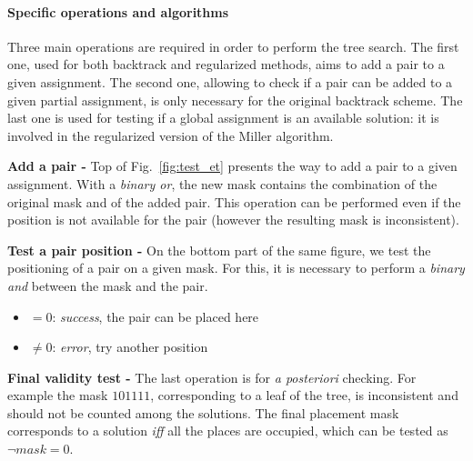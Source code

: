 \paragraph{Specific operations and algorithms}

Three main operations are required in order to perform the tree search. 
The first one, used for both backtrack and regularized methods, aims to add a pair to a given assignment. 
The second one, allowing to check if a pair can be added to a given partial assignment, is only necessary for the original backtrack scheme.
The last one is used for testing if a global assignment is an available solution: it is involved in the regularized version of the Miller algorithm.

\textbf{Add a pair -}
Top of Fig.~\ref{fig:test_et} presents the way to add a pair to a given assignment.
With a \emph{binary or}, the new mask contains the combination of the original mask and of the added pair.
This operation can be performed even if the position is not available for the pair (however the resulting mask is inconsistent). 

\textbf{Test a pair position -}
On the bottom part of the same figure, we test the positioning of a pair on a given mask. 
For this, it is necessary to perform a \emph{binary and} between the mask and the pair.
\begin{itemize}
	\item[] $=0$: \emph{success}, the pair can be placed here
	\item[] $\neq0$: \emph{error}, try another position
\end{itemize}

\textbf{Final validity test -}
The last operation is for \emph{a posteriori} checking. For example the mask $101111$, corresponding to a leaf of the tree, is inconsistent and should not be counted among the solutions.
The final placement mask corresponds to a solution \emph{iff} all the places are occupied, which can be tested as $\neg mask = 0$. %
\\

